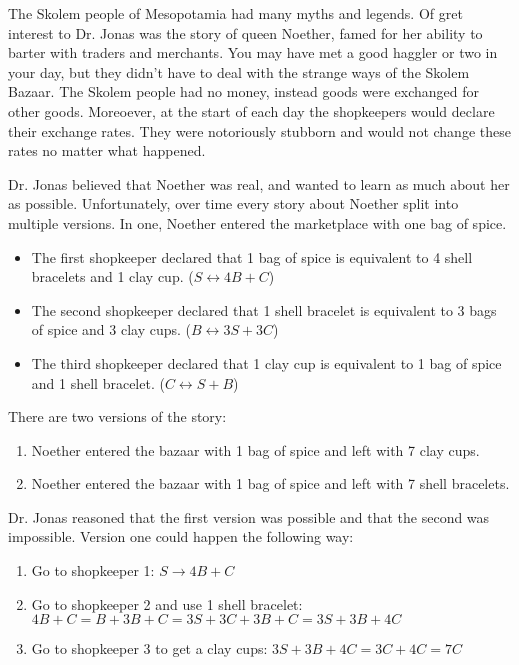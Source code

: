 The Skolem people of Mesopotamia had many myths and legends.
Of gret interest to Dr. Jonas was the story of queen Noether, famed for her ability to barter with traders and merchants.
You may have met a good haggler or two in your day, but they didn't have to deal with the strange ways of the Skolem Bazaar.
The Skolem people had no money, instead goods were exchanged for other goods.
Moreoever, at the start of each day the shopkeepers would declare their exchange rates.
They were notoriously stubborn and would not change these rates no matter what happened.

Dr. Jonas believed that Noether was real, and wanted to learn as much about her as possible.
Unfortunately, over time every story about Noether split into multiple versions.
In one, Noether entered the marketplace with one bag of spice.
\begin{itemize}
  \item The first shopkeeper declared that 1 bag of spice is equivalent to 4 shell bracelets and 1 clay cup. (\(S \leftrightarrow 4B + C\))
  \item The second shopkeeper declared that 1 shell bracelet is equivalent to 3 bags of spice and 3 clay cups. (\(B \leftrightarrow 3S + 3C\))
  \item The third shopkeeper declared that 1 clay cup is equivalent to 1 bag of spice and 1 shell bracelet. (\(C \leftrightarrow S + B\))    
\end{itemize}
There are two versions of the story:
\begin{enumerate}
  \item Noether entered the bazaar with 1 bag of spice and left with 7 clay cups.
  \item Noether entered the bazaar with 1 bag of spice and left with 7 shell bracelets.
\end{enumerate}

Dr. Jonas reasoned that the first version was possible and that the second was impossible.
Version one could happen the following way:
\begin{enumerate}
  \item Go to shopkeeper 1: \(S \rightarrow 4B + C\)
  \item Go to shopkeeper 2 and use 1 shell bracelet: \(4B + C = B + 3B + C = 3S + 3C + 3B + C = 3S + 3B + 4C\)
  \item Go to shopkeeper 3 to get a clay cups: \(3S + 3B + 4C = 3C + 4C = 7C\)
\end{enumerate}

